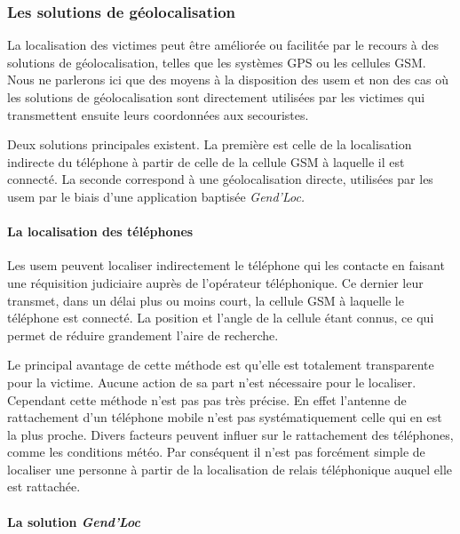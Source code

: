 \subsubsection{Les solutions de géolocalisation}
\label{subsec:1-1-2-2}

La localisation des victimes peut être améliorée ou facilitée par le
recours à des solutions de géolocalisation, telles que les systèmes
GPS ou les cellules GSM. Nous ne parlerons ici que des moyens à la
disposition des \ac{usem} et non des cas où les solutions de
géolocalisation sont directement utilisées par les victimes qui
transmettent ensuite leurs coordonnées aux secouristes.

Deux solutions principales existent. La première est celle de la
localisation indirecte du téléphone à partir de celle de la cellule
GSM à laquelle il est connecté. La seconde correspond à une
géolocalisation directe, utilisées par les \ac{usem} par le biais
d'une application baptisée \emph{Gend'Loc.}

\paragraph{La localisation des téléphones}

Les \ac{usem} peuvent localiser indirectement le téléphone qui les
contacte en faisant une réquisition judiciaire auprès de l'opérateur
téléphonique. Ce dernier leur transmet, dans un délai plus ou moins
court, %
la cellule GSM à laquelle le téléphone est
connecté. La position et l'angle de la cellule étant connus, ce qui
permet de réduire grandement l'aire de recherche.

Le principal avantage de cette méthode est qu'elle est totalement
transparente pour la victime. Aucune action de sa part n'est
nécessaire pour le localiser. Cependant cette méthode n'est pas pas
très précise. En effet l'antenne de rattachement d'un téléphone mobile
n'est pas systématiquement celle qui en est la plus proche. Divers
facteurs peuvent influer sur le rattachement des téléphones, comme les
conditions météo.
% 
Par conséquent il n'est pas forcément simple de localiser une personne
à partir de la localisation de relais téléphonique auquel elle est
rattachée. 

\paragraph{La solution \emph{Gend'Loc}}

